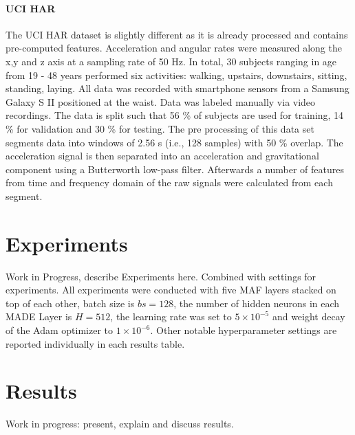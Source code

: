 \documentclass[11pt,titlepage,oneside,openany]{book}
\begin{document}
\paragraph{UCI HAR}
The UCI HAR dataset is slightly different as it is already processed and contains pre-computed features. Acceleration and angular rates were measured along the x,y and z axis at a sampling rate of 50 Hz. In total, 30 subjects ranging in age from 19 - 48 years performed six activities: walking, upstairs, downstairs, sitting, standing, laying. All data was recorded with smartphone sensors from a Samsung Galaxy S II positioned at the waist. Data was labeled manually via video recordings. The data is split such that 56 \% of subjects are used for training, 14 \% for validation and 30 \% for testing. The pre processing of this data set segments data into windows of 2.56 s (i.e., 128 samples) with 50 \% overlap. The acceleration signal is then separated into an acceleration and gravitational component using a Butterworth low-pass filter. Afterwards a number of features from time and frequency domain of the raw signals were calculated from each segment.


\section{Experiments}
\label{sec:exp}
Work in Progress, describe Experiments here. Combined with settings for experiments.
All experiments were conducted with five MAF layers stacked on top of each other, batch size is $bs = 128$, the number of hidden neurons in each MADE Layer is $H=512$, the learning rate was set to $5 \times 10^{-5}$ and weight decay of the Adam optimizer to $1 \times 10^{-6}$. Other notable hyperparameter settings are reported individually in each results table.


\section{Results}
\label{sec:results}
Work in progress: present, explain and discuss results.
\end{document}
